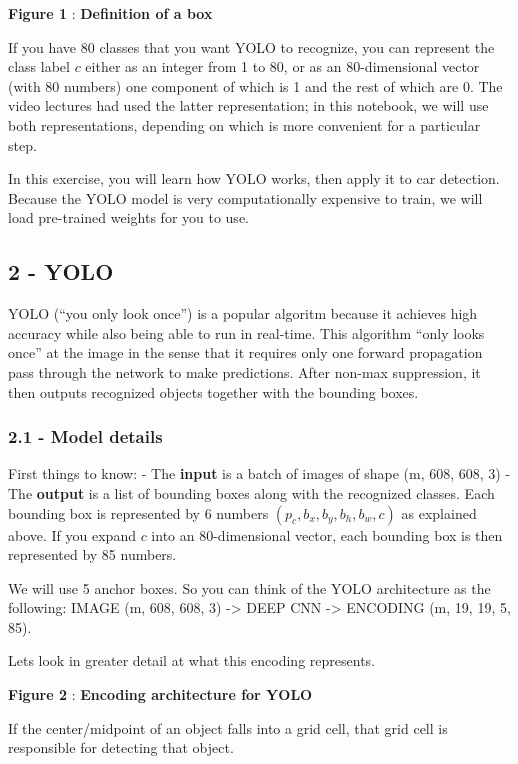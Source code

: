 \documentclass[11pt]{article}
\begin{document}
 \textbf{Figure 1} : \textbf{Definition of a box}

If you have 80 classes that you want YOLO to recognize, you can
represent the class label \(c\) either as an integer from 1 to 80, or as
an 80-dimensional vector (with 80 numbers) one component of which is 1
and the rest of which are 0. The video lectures had used the latter
representation; in this notebook, we will use both representations,
depending on which is more convenient for a particular step.

In this exercise, you will learn how YOLO works, then apply it to car
detection. Because the YOLO model is very computationally expensive to
train, we will load pre-trained weights for you to use.

    \hypertarget{yolo}{%
\subsection{2 - YOLO}\label{yolo}}

    YOLO (``you only look once'') is a popular algoritm because it achieves
high accuracy while also being able to run in real-time. This algorithm
``only looks once'' at the image in the sense that it requires only one
forward propagation pass through the network to make predictions. After
non-max suppression, it then outputs recognized objects together with
the bounding boxes.

\hypertarget{model-details}{%
\subsubsection{2.1 - Model details}\label{model-details}}

First things to know: - The \textbf{input} is a batch of images of shape
(m, 608, 608, 3) - The \textbf{output} is a list of bounding boxes along
with the recognized classes. Each bounding box is represented by 6
numbers \((p_c, b_x, b_y, b_h, b_w, c)\) as explained above. If you
expand \(c\) into an 80-dimensional vector, each bounding box is then
represented by 85 numbers.

We will use 5 anchor boxes. So you can think of the YOLO architecture as
the following: IMAGE (m, 608, 608, 3) -\textgreater{} DEEP CNN
-\textgreater{} ENCODING (m, 19, 19, 5, 85).

Lets look in greater detail at what this encoding represents.

 \textbf{Figure 2} : \textbf{Encoding architecture for YOLO}

If the center/midpoint of an object falls into a grid cell, that grid
cell is responsible for detecting that object.
\end{document}
